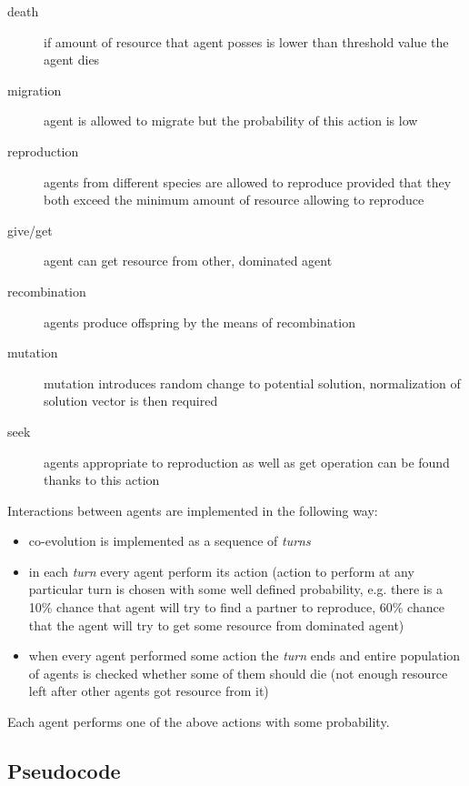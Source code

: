 \begin{description}
  \item [death]
      if amount of resource that agent posses is lower than threshold value the agent dies
  \item [migration]
      agent is allowed to migrate but the probability of this action is low
  \item [reproduction]
      agents from different species are allowed to reproduce provided that they both exceed the minimum amount of resource allowing to reproduce
  \item [give/get]
      agent can get resource from other, dominated agent
  \item [recombination]
      agents produce offspring by the means of recombination
  \item [mutation]
      mutation introduces random change to potential solution, normalization of solution vector is then required 
  \item [seek]
      agents appropriate  to reproduction as well as get operation can be found thanks to this action
\end{description}

Interactions between agents are implemented in the following way:
\begin{itemize}
  \item co-evolution is implemented as a sequence of \emph{turns}
  \item in each \emph{turn} every agent perform its action (action to perform at any particular turn is chosen with some well defined probability, e.g. there is a 10\% chance that agent will try to find
	a partner to reproduce, 60\% chance that the agent will try to get some resource from dominated agent)
  \item when every agent performed some action the \emph{turn} ends and entire population of agents is checked whether some of them should die (not enough resource left after other agents got resource
	from it)
\end{itemize}


Each agent performs one of the above actions with some probability.

\subsection{Pseudocode}


% 


